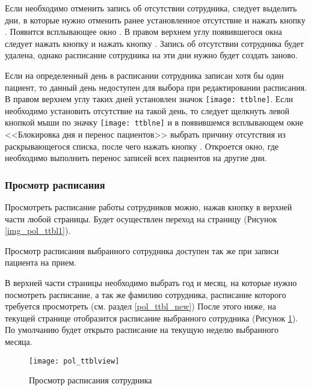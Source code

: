 Если необходимо отменить запись об отсутствии сотрудника, следует выделить дни, в которые нужно отменить ранее установленное отсутствие и нажать кнопку . Появится всплывающее окно . В правом верхнем углу появившегося окна следует нажать кнопку  и нажать кнопку . Запись об отсутствии сотрудника будет удалена, однако расписание сотрудника на эти дни нужно будет создать заново.

Если на определенный день в расписании сотрудника записан хотя бы один пациент, то данный день недоступен для выбора при редактировании расписания. В правом верхнем углу таких дней установлен значок \texttt{[image: ttblne]}. Если необходимо установить отсутствие на такой день, то следует щелкнуть левой кнопкой мыши по значку \texttt{[image: ttblne]} и в появившемся всплывающем окне <<Блокировка дня и перенос пациентов>> выбрать причину отсутствия из раскрывающегося списка, после чего нажать кнопку . Откроется окно, где необходимо выполнить перенос записей всех пациентов на другие дни. 

\subsubsection{Просмотр расписания} \label{pol_ttbl_view}

Просмотреть расписание работы сотрудников можно, нажав кнопку  в верхней части любой страницы. Будет осуществлен переход на страницу  (Рисунок \ref{img_pol_ttbl1}).

\begin{prim}
 Просмотр расписания выбранного сотрудника доступен так же при записи пациента на прием.
\end{prim}

В верхней части страницы необходимо выбрать год и месяц, на которые нужно посмотреть расписание, а так же фамилию сотрудника, расписание которого требуется просмотреть (см. раздел \ref{pol_ttbl_new}) После этого ниже, на текущей  странице отобразится расписание выбранного сотрудника (Рисунок \ref{img_pol_ttblview}). По умолчанию будет открыто расписание на текущую неделю выбранного месяца. 

\begin{figure}[ht]\centering
 \texttt{[image: pol\_ttblview]}
 \caption{Просмотр расписания сотрудника}
 \label{img_pol_ttblview}
\end{figure}

